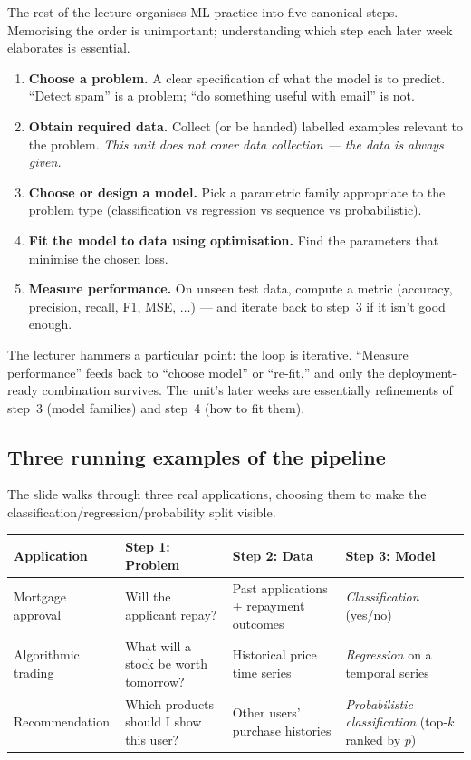 \documentclass[11pt, a4paper]{article}
\newcommand{\thead}[1]{\textbf{#1}}
\begin{document}
The rest of the lecture organises ML practice into five canonical steps. Memorising the order is unimportant; understanding which step each later week elaborates is essential.

\begin{defbox}
\begin{enumerate}
  \item \textbf{Choose a problem.} A clear specification of what the model is to predict. ``Detect spam'' is a problem; ``do something useful with email'' is not.
  \item \textbf{Obtain required data.} Collect (or be handed) labelled examples relevant to the problem. \emph{This unit does not cover data collection — the data is always given.}
  \item \textbf{Choose or design a model.} Pick a parametric family appropriate to the problem type (classification vs regression vs sequence vs probabilistic).
  \item \textbf{Fit the model to data using optimisation.} Find the parameters that minimise the chosen loss.
  \item \textbf{Measure performance.} On unseen test data, compute a metric (accuracy, precision, recall, F1, MSE, $\ldots$) — and iterate back to step~3 if it isn't good enough.
\end{enumerate}
\end{defbox}

The lecturer hammers a particular point: the loop is iterative. ``Measure performance'' feeds back to ``choose model'' or ``re-fit,'' and only the deployment-ready combination survives. The unit's later weeks are essentially refinements of step~3 (model families) and step~4 (how to fit them).

\subsection{Three running examples of the pipeline}

The slide walks through three real applications, choosing them to make the classification/regression/probability split visible.

\begin{center}
\renewcommand{\arraystretch}{1.2}
\begin{tabularx}{\linewidth}{l X X X}
\toprule
\thead{Application} & \thead{Step 1: Problem} & \thead{Step 2: Data} & \thead{Step 3: Model} \\
\midrule
Mortgage approval & Will the applicant repay? & Past applications + repayment outcomes & \emph{Classification} (yes/no) \\
Algorithmic trading & What will a stock be worth tomorrow? & Historical price time series & \emph{Regression} on a temporal series \\
Recommendation & Which products should I show this user? & Other users' purchase histories & \emph{Probabilistic classification} (top-$k$ ranked by $p$) \\
\bottomrule
\end{tabularx}
\end{center}
\end{document}
